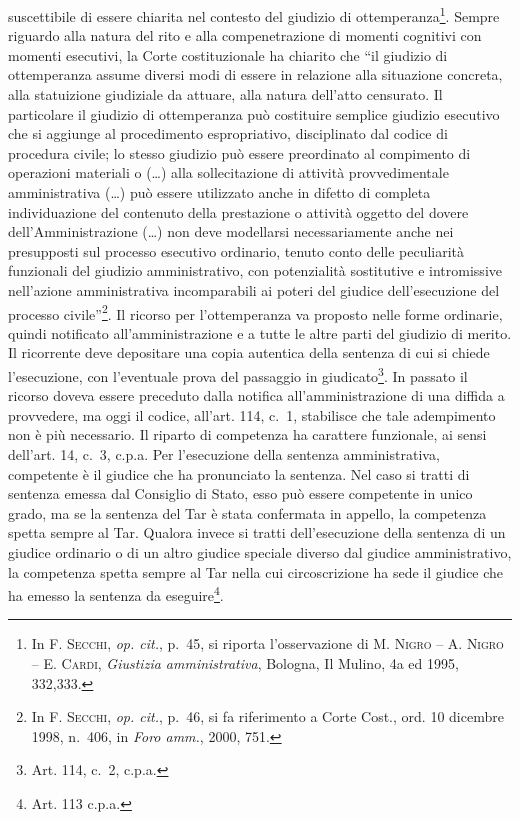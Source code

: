 \documentclass[12pt,it,a4paper,]{report}
\begin{document}
suscettibile di essere chiarita nel contesto del giudizio di
ottemperanza\footnote{In \textsc{F. Secchi}, \emph{op. cit.}, p.~45, si
  riporta l'osservazione di M. \textsc{Nigro} -- A. \textsc{Nigro} -- E.
  \textsc{Cardi}, \emph{Giustizia amministrativa}, Bologna, Il Mulino,
  4a ed 1995, 332,333.}. Sempre riguardo alla natura del rito e alla
compenetrazione di momenti cognitivi con momenti esecutivi, la Corte
costituzionale ha chiarito che ``il giudizio di ottemperanza assume
diversi modi di essere in relazione alla situazione concreta, alla
statuizione giudiziale da attuare, alla natura dell'atto censurato. Il
particolare il giudizio di ottemperanza può costituire semplice giudizio
esecutivo che si aggiunge al procedimento espropriativo, disciplinato
dal codice di procedura civile; lo stesso giudizio può essere
preordinato al compimento di operazioni materiali o (\ldots) alla
sollecitazione di attività provvedimentale amministrativa (\ldots) può
essere utilizzato anche in difetto di completa individuazione del
contenuto della prestazione o attività oggetto del dovere
dell'Amministrazione (\ldots) non deve modellarsi necessariamente anche
nei presupposti sul processo esecutivo ordinario, tenuto conto delle
peculiarità funzionali del giudizio amministrativo, con potenzialità
sostitutive e intromissive nell'azione amministrativa incomparabili ai
poteri del giudice dell'esecuzione del processo civile''\footnote{In
  \textsc{F. Secchi}, \emph{op. cit.}, p.~46, si fa riferimento a Corte
  Cost., ord. 10 dicembre 1998, n.~406, in \emph{Foro amm.}, 2000, 751.}.
Il ricorso per l'ottemperanza va proposto nelle forme ordinarie, quindi
notificato all'amministrazione e a tutte le altre parti del giudizio di
merito. Il ricorrente deve depositare una copia autentica della sentenza
di cui si chiede l'esecuzione, con l'eventuale prova del passaggio in
giudicato\footnote{Art. 114, c.~2, c.p.a.}. In passato il ricorso doveva
essere preceduto dalla notifica all'amministrazione di una diffida a
provvedere, ma oggi il codice, all'art. 114, c.~1, stabilisce che tale
adempimento non è più necessario. Il riparto di competenza ha carattere
funzionale, ai sensi dell'art. 14, c.~3, c.p.a. Per l'esecuzione della
sentenza amministrativa, competente è il giudice che ha pronunciato la
sentenza. Nel caso si tratti di sentenza emessa dal Consiglio di Stato,
esso può essere competente in unico grado, ma se la sentenza del Tar è
stata confermata in appello, la competenza spetta sempre al Tar. Qualora
invece si tratti dell'esecuzione della sentenza di un giudice ordinario
o di un altro giudice speciale diverso dal giudice amministrativo, la
competenza spetta sempre al Tar nella cui circoscrizione ha sede il
giudice che ha emesso la sentenza da eseguire\footnote{Art. 113 c.p.a.}.
\end{document}
